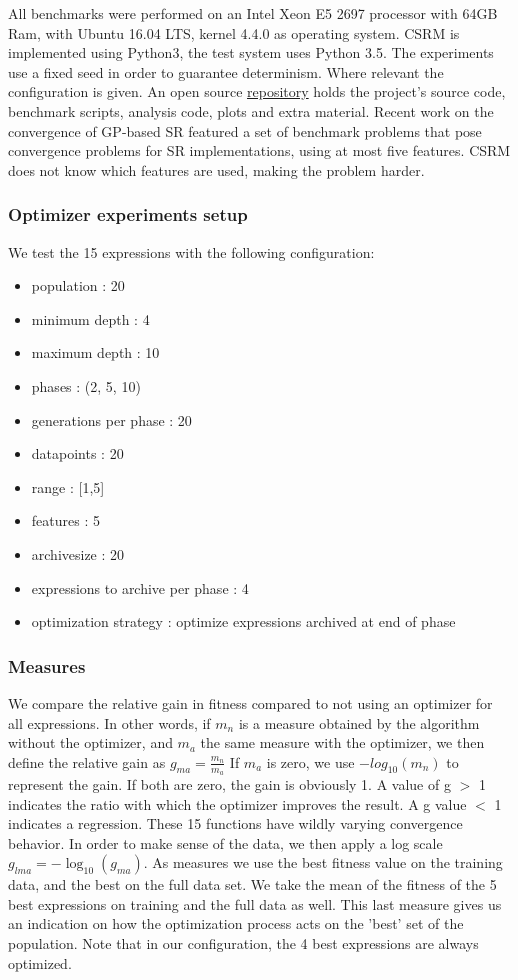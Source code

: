All benchmarks were performed on an Intel Xeon E5 2697 processor with 64GB Ram, with Ubuntu 16.04 LTS, kernel 4.4.0 as operating system. CSRM is implemented using Python3, the test system uses Python 3.5.  The experiments use a fixed seed in order to guarantee determinism. Where relevant the configuration is given. An open source \href{https://bitbucket.org/bcardoen/csrm}{repository} holds the project's source code, benchmark scripts, analysis code, plots and extra material. 
Recent work on the convergence of GP-based SR \cite{SRAccur, SRBaseline} featured a set of benchmark problems that pose convergence problems for SR implementations, using at most five features. CSRM does not know which features are used, making the problem harder. 
\subsubsection{Optimizer experiments setup}
We test the 15 expressions with the following configuration:
\begin{itemize}
\item population : 20
\item minimum depth : 4
\item maximum depth : 10
\item phases : (2, 5, 10)
\item generations per phase : 20
\item datapoints : 20
\item range : [1,5]
\item features : 5
\item archivesize : 20
\item expressions to archive per phase : 4
\item optimization strategy : optimize expressions archived at end of phase
\end{itemize}
\subsubsection{Measures}
We compare the relative gain in fitness compared to not using an optimizer for all expressions. 
In other words, if $m_n$ is a measure obtained by the algorithm without the optimizer, and $m_a$ the same measure with the optimizer, we then define the relative gain as $ g_{ma} = \frac{m_n}{m_a} $ If $m_a$ is zero, we use $-log_{10}(m_n)$ to represent the gain. If both are zero, the gain is obviously 1. A value of g $>$ 1 indicates the ratio with which the optimizer improves the result. A g value $<$ 1 indicates a regression. These 15 functions have wildly varying convergence behavior. In order to make sense of the data, we then apply a log scale $ g_{lma} = - \log_{10}(g_{ma}) $.
As measures we use the best fitness value on the training data, and the best on the full data set. We take the mean of the fitness of the 5 best expressions on training and the full data as well. This last measure gives us an indication on how the optimization process acts on the 'best' set of the population. Note that in our configuration, the 4 best expressions are always optimized.
